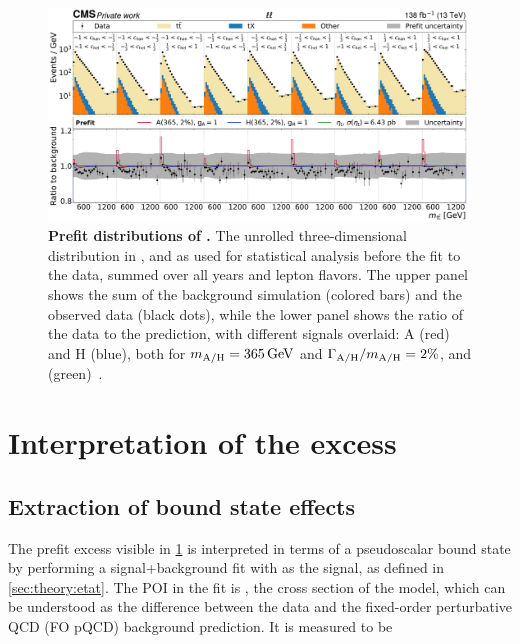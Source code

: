 \begin{figure}[t]
    \centering
    \includegraphics[width=0.99\textwidth]{figures/ah/prepost/A_m365_w2p0__H_m365_w2p0_fit_p_ll_run2_both.pdf}
    \caption{
        \textbf{Prefit distributions of \mttchelchan.} The unrolled three-dimensional distribution in \mtt, \chel and \chan as used for statistical analysis before the fit to the data, summed over all years and lepton flavors. The upper panel shows the sum of the background simulation (colored bars) and the observed data (black dots), while the lower panel shows the ratio of the data to the prediction, with different signals overlaid: A (red) and H (blue), both for $\mAH = \SI{365}{\GeV}$ and $\Gamma_{\mathrm{A/H}}/m_{\mathrm{A/H}} = 2\%$, and \etat (green)~\cite{CMS:HIG-22-013}.
    }
    \label{fig:ah:prefit_ll}
\end{figure}


\section{Interpretation of the excess}
\label{sec:ah:excess}

\subsection{Extraction of \ttbartitle bound state effects}
\label{sec:ah:etat}

The prefit excess visible in \cref{fig:ah:prefit_ll} is interpreted in terms of a pseudoscalar \ttbar bound state by performing a signal+background fit with \etat as the signal, as defined in \cref{sec:theory:etat}. The POI in the fit is \sigetat, the cross section of the \etat model, which can be understood as the difference between the data and the fixed-order perturbative QCD (FO pQCD) background prediction. It is measured to be

